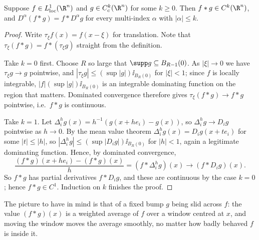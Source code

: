 \begin{theorem}\label{thm:convsmooth}
	Suppose $f \in L^1_{\mathrm{loc}}(\R^n)$ and $g \in C^k_c(\R^n)$ for some $k \ge 0$. Then $f * g \in C^k(\R^n)$, and $D^\alpha(f*g) = f * D^\alpha g$ for every multi-index $\alpha$ with $|\alpha| \le k$.
\end{theorem}

\begin{proof}
	Write $\tau_\xi f(x) = f(x - \xi)$ for translation. Note that $\tau_\xi(f*g) = f * (\tau_\xi g)$ straight from the definition.

	Take $k = 0$ first. Choose $R$ so large that $\supp g \subseteq B_{R-1}(0)$. As $|\xi| \to 0$ we have $\tau_\xi g \to g$ pointwise, and $|\tau_\xi g| \le (\sup |g|) \ii_{B_R(0)}$ for $|\xi| < 1$; since $f$ is locally integrable, $|f| (\sup|g|)\ii_{B_R(0)}$ is an integrable dominating function on the region that matters. Dominated convergence therefore gives $\tau_\xi (f * g) \to f*g$ pointwise, i.e.\ $f * g$ is continuous.

	Take $k = 1$. Let $\Delta^h_i g(x) = h^{-1}(g(x + he_i) - g(x))$, so $\Delta^h_i g \to D_i g$ pointwise as $h \to 0$. By the mean value theorem $\Delta^h_i g(x) = D_i g(x + te_i)$ for some $|t| \le |h|$, so $|\Delta^h_i g| \le (\sup |D_i g|)\ii_{B_R(0)}$ for $|h| < 1$, again a legitimate dominating function. Hence, by dominated convergence,
	$$\frac{(f*g)(x + he_i) - (f*g)(x)}{h} = (f * \Delta^h_i g)(x) \longrightarrow (f * D_i g)(x).$$
	So $f * g$ has partial derivatives $f * D_i g$, and these are continuous by the case $k=0$; hence $f*g \in C^1$. Induction on $k$ finishes the proof.
\end{proof}

The picture to have in mind is that of a fixed bump $g$ being slid across $f$: the value $(f * g)(x)$ is a weighted average of $f$ over a window centred at $x$, and moving the window moves the average smoothly, no matter how badly behaved $f$ is inside it.

\begin{center}
\end{center}

